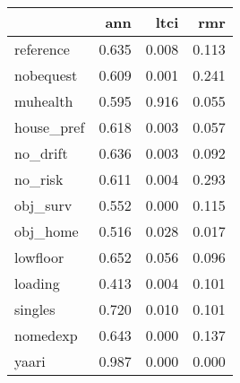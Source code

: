 \begin{tabular}{lrrr}
\toprule
{} &    ann &   ltci &    rmr \\
\midrule
reference  &  0.635 &  0.008 &  0.113 \\
nobequest  &  0.609 &  0.001 &  0.241 \\
muhealth   &  0.595 &  0.916 &  0.055 \\
house\_pref &  0.618 &  0.003 &  0.057 \\
no\_drift   &  0.636 &  0.003 &  0.092 \\
no\_risk    &  0.611 &  0.004 &  0.293 \\
obj\_surv   &  0.552 &  0.000 &  0.115 \\
obj\_home   &  0.516 &  0.028 &  0.017 \\
lowfloor   &  0.652 &  0.056 &  0.096 \\
loading    &  0.413 &  0.004 &  0.101 \\
singles    &  0.720 &  0.010 &  0.101 \\
nomedexp   &  0.643 &  0.000 &  0.137 \\
yaari      &  0.987 &  0.000 &  0.000 \\
\bottomrule
\end{tabular}
